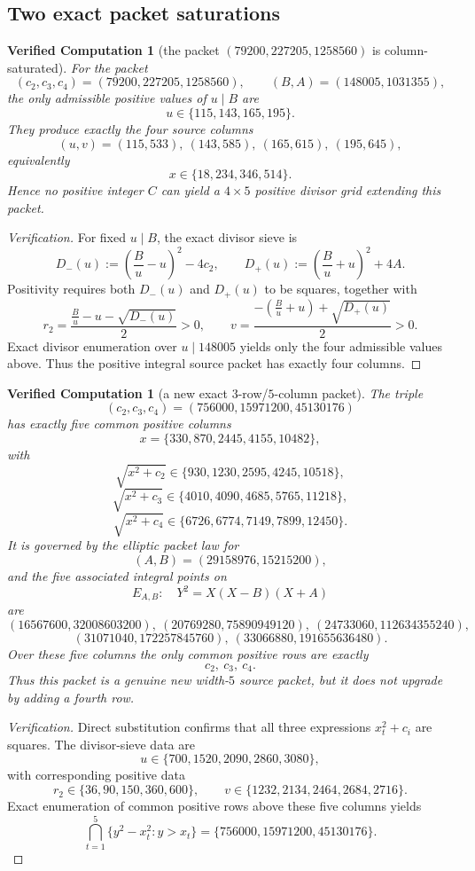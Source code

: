 \documentclass[11pt]{article}
\theoremstyle{plainbreak}
\theoremstyle{defbreak}
\newtheorem{computation}[theorem]{Verified Computation}
\begin{document}
\subsection{Two exact packet saturations}

\begin{computation}[the packet $(79200,227205,1258560)$ is column-saturated]
For the packet
\[
(c_2,c_3,c_4)=(79200,227205,1258560),
\qquad
(B,A)=(148005,1031355),
\]
the only admissible positive values of $u\mid B$ are
\[
u\in\{115,143,165,195\}.
\]
They produce exactly the four source columns
\[
(u,v)=
(115,533),\ (143,585),\ (165,615),\ (195,645),
\]
equivalently
\[
x\in\{18,234,346,514\}.
\]
Hence no positive integer $C$ can yield a $4\times 5$ positive divisor grid extending this packet.
\end{computation}

\begin{proof}[Verification]
For fixed $u\mid B$, the exact divisor sieve is
\[
D_-(u):=\left(\frac Bu-u\right)^2-4c_2,
\qquad
D_+(u):=\left(\frac Bu+u\right)^2+4A.
\]
Positivity requires both $D_-(u)$ and $D_+(u)$ to be squares, together with
\[
r_2=\frac{\frac Bu-u-\sqrt{D_-(u)}}{2}>0,
\qquad
v=\frac{-\left(\frac Bu+u\right)+\sqrt{D_+(u)}}{2}>0.
\]
Exact divisor enumeration over $u\mid 148005$ yields only the four admissible values above. Thus the positive integral source packet has exactly four columns.
\end{proof}

\begin{computation}[a new exact $3$-row/$5$-column packet]
The triple
\[
(c_2,c_3,c_4)=(756000,15971200,45130176)
\]
has exactly five common positive columns
\[
x=\{330,870,2445,4155,10482\},
\]
with
\[
\sqrt{x^2+c_2}\in\{930,1230,2595,4245,10518\},
\]
\[
\sqrt{x^2+c_3}\in\{4010,4090,4685,5765,11218\},
\]
\[
\sqrt{x^2+c_4}\in\{6726,6774,7149,7899,12450\}.
\]
It is governed by the elliptic packet law for
\[
(A,B)=(29158976,15215200),
\]
and the five associated integral points on
\[
E_{A,B}:\quad Y^2=X(X-B)(X+A)
\]
are
\[
(16567600,32008603200),\ 
(20769280,75890949120),\ 
(24733060,112634355240),
\]
\[
(31071040,172257845760),\ 
(33066880,191655636480).
\]
Over these five columns the only common positive rows are exactly
\[
c_2,\ c_3,\ c_4.
\]
Thus this packet is a genuine new width-$5$ source packet, but it does not upgrade by adding a fourth row.
\end{computation}

\begin{proof}[Verification]
Direct substitution confirms that all three expressions $x_t^2+c_i$ are squares. The divisor-sieve data are
\[
u\in\{700,1520,2090,2860,3080\},
\]
with corresponding positive data
\[
r_2\in\{36,90,150,360,600\},\qquad
v\in\{1232,2134,2464,2684,2716\}.
\]
Exact enumeration of common positive rows above these five columns yields
\[
\bigcap_{t=1}^5 \{y^2-x_t^2:y>x_t\}
=
\{756000,15971200,45130176\}.
\]
\end{proof}
\end{document}
